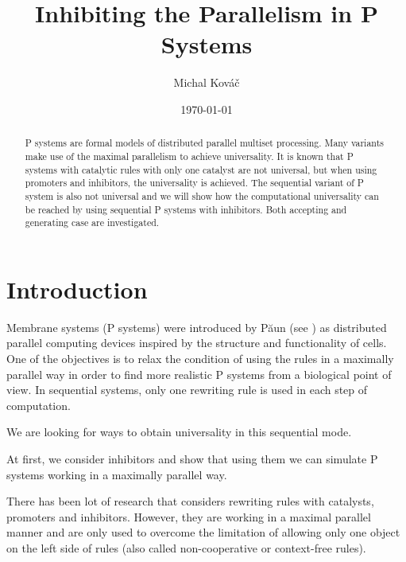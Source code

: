 \documentclass[llncs,submission,copyright,creativecommons]{../lib/lncs/llncs}
\begin{document}
\title{Inhibiting the Parallelism in P Systems}
\author{Michal Kováč}
\date{\today}
\maketitle

\begin{abstract}
P systems are formal models of distributed parallel multiset processing. Many variants make use of the maximal parallelism to achieve universality.
It is known that P systems with catalytic rules with only one catalyst are not universal, but when using promoters and inhibitors, the universality is achieved.
The sequential variant of P system is also not universal and we will show how the computational universality can be reached by using sequential P systems with inhibitors. Both accepting and generating case are investigated.
\end{abstract}

\section{Introduction}
\label{sec:introduction}


Membrane systems (P systems) were introduced by P\u{a}un (see \cite{Paun2000108}) as distributed parallel computing devices inspired by the structure and functionality of cells.
One of the objectives is to relax the condition of using the rules in a maximally parallel way in order to find more realistic P systems from a biological point of view.
In sequential systems, only one rewriting rule is used in each step of computation.


We are looking for ways to obtain universality in this sequential mode.


At first, we consider inhibitors and show that using them we can simulate P systems working in a maximally parallel way.



There has been lot of research that considers rewriting rules with catalysts, promoters and inhibitors. However, they are working in a maximal parallel manner and are only used to overcome the limitation of allowing only one object on the left side of rules (also called non-cooperative or context-free rules).
\end{document}
